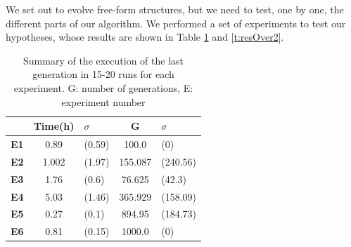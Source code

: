 \documentclass[sigconf]{acmart}
\newcommand{\myfloatalign}{\centering} %
\begin{document}
We set out to evolve free-form structures, but we need to test, one by
one, the different parts of our algorithm.
We performed a set of experiments to test our hypotheses,
whose results are shown in Table \ref{t:resOver1} and \ref{t:resOver2}.

\begin{table}
	\myfloatalign
	\begin{tabular}{cclcl}
		& \textbf{Time(h)} &$\sigma$ & \textbf{G}& $\sigma$ \\ \hline
		\textbf{E1}&0.89&(0.59)&100.0&(0)\\  \hline
		\textbf{E2}&1.002&(1.97)&155.087&(240.56) \\  \hline
		\textbf{E3}&1.76&(0.6)&76.625&(42.3)\\  \hline
		\textbf{E4}&5.03&(1.46)&365.929&(158.09)  \\  \hline
		\textbf{E5}&0.27&(0.1)&894.95&(184.73)     \\  \hline 
		\textbf{E6}&0.81&(0.15)&1000.0&(0) \\  \hline
		\hline
	\end{tabular}
	\caption{Summary of the execution of the last generation in 15-20 runs for 
	each
		experiment.
		G: number of generations, E: experiment 
		number} %
	\label{t:resOver1}
\end{table}
\end{document}
